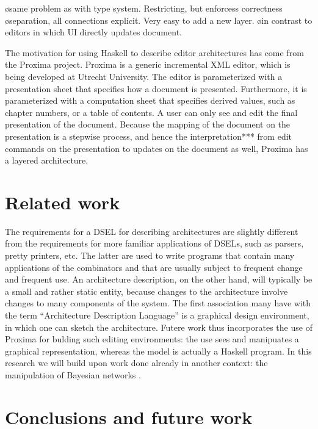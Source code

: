 \documentclass[preprint,natbib]{sigplanconf}
\begin{document}
\bl
\o same problem as with type system. Restricting, but enforcess correctness
\o separation, all connections explicit. Very easy to add a new layer. 
\o in contrast to editors in which UI directly updates document.
\el
\ec

\bc
The motivation for using Haskell to describe editor architectures has come from the Proxima project. Proxima is a generic incremental XML editor, which is being developed at Utrecht University. The editor is parameterized with a presentation sheet that specifies how a document is presented. Furthermore, it is parameterized with a computation sheet that specifies derived values, such as chapter numbers, or a table of contents. A user can only see and edit the final presentation of the document. Because the mapping of the document on the presentation is a stepwise process, and hence the interpretation*** from edit commands on the presentation to updates on the document as well, Proxima has a layered architecture.
\ec


\bc
%																
%																
%																
\section{Related work} \label{sect:relatedWork}


The requirements for a DSEL for describing architectures are slightly different from the requirements for more familiar applications of DSELs, such as parsers, pretty printers, etc. The latter are used to write programs that contain many applications of the combinators and that are usually subject to frequent change and frequent use. An architecture description, on the other hand, will typically be a small and rather static entity, because changes to the architecture involve changes to many components of the system. The first association many have with the term ``Architecture Description Language'' is a graphical design environment, in which one can sketch the architecture. Futere work thus incorporates the use of Proxima for bulding such editing environments: the use sees and manipuates a graphical representation, whereas the model is actually a Haskell program. In this research we will build upon work done already in another context: the manipulation of Bayesian networks \cite{schrage05Dazzle}. 
\ec



%																
%																
%																
\section{Conclusions and future work} \label{sect:conclusions}
\end{document}
